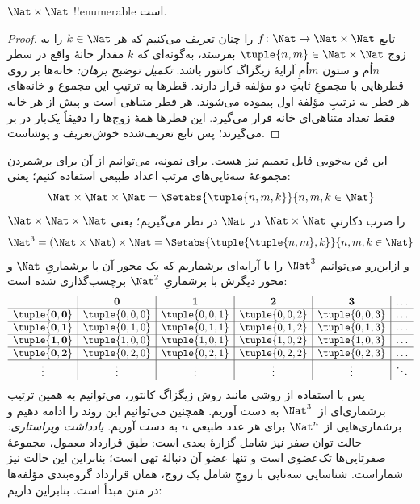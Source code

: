 \documentclass[../../../include/open-logic-section]{subfiles}
\begin{document}
\begin{prop}
$\Nat \times \Nat$ !!{enumerable} است.
\end{prop}

\begin{proof}
تابع $f \colon \Nat \to \Nat\times\Nat$ را چنان تعریف می‌کنیم که هر
$k \in \Nat$ را به زوج $\tuple{n,m} \in \Nat \times \Nat$ بفرستد،
به‌گونه‌ای که $k$
مقدار خانهٔ واقع در سطر $n$اُم و ستون $m$اُمِ آرایهٔ زیگزاگ کانتور باشد.
\emph{تکمیل توضیح برهان:} خانه‌ها بر روی قطرهایی با مجموعِ ثابتِ دو مؤلفه
قرار دارند. قطرها به ترتیبِ این مجموع و خانه‌های هر قطر به ترتیبِ مؤلفهٔ اول
پیموده می‌شوند. هر قطر متناهی است و پیش از هر خانه فقط تعداد متناهی‌ای خانه
قرار می‌گیرد. این قطرها همهٔ زوج‌ها را دقیقاً یک‌بار در بر می‌گیرند؛ پس تابع
تعریف‌شده خوش‌تعریف و پوشاست.
\end{proof}

\begin{explain}
این فن به‌خوبی قابل تعمیم نیز هست. برای نمونه، می‌توانیم از آن برای
برشمردن مجموعهٔ سه‌تایی‌های مرتب اعداد طبیعی استفاده کنیم؛ یعنی:
\[
\Nat \times \Nat \times \Nat = \Setabs{\tuple{n,m,k}}{n,m,k \in \Nat}
\]
$\Nat \times \Nat \times \Nat$ را ضرب دکارتیِ
$\Nat \times \Nat$ در $\Nat$ در نظر می‌گیریم؛ یعنی
\[
\Nat^3 = (\Nat \times \Nat) \times \Nat =
\Setabs{\tuple{\tuple{n,m},k}}{n, m, k
  \in \Nat }
\]
و ازاین‌رو می‌توانیم $\Nat^3$ را با آرایه‌ای برشماریم که یک محور آن
با برشماریِ $\Nat$ و محور دیگرش با برشماریِ $\Nat^2$ برچسب‌گذاری شده است:
\[
\begin{array}{ c | c | c | c | c | c}
& \mathbf 0 & \mathbf 1 & \mathbf 2 & \mathbf 3 & \dots \\
\hline
\mathbf{\tuple{0,0}} & \tuple{0,0,0} & \tuple{0,0,1} & \tuple{0,0,2} & \tuple{0,0,3} & \dots \\
\hline
\mathbf{\tuple{0,1}} & \tuple{0,1,0} & \tuple{0,1,1} & \tuple{0,1,2} & \tuple{0,1,3} & \dots \\
\hline
\mathbf{\tuple{1,0}} & \tuple{1,0,0} & \tuple{1,0,1} & \tuple{1,0,2} & \tuple{1,0,3} & \dots \\
\hline
\mathbf{\tuple{0,2}} & \tuple{0,2,0} & \tuple{0,2,1} & \tuple{0,2,2} & \tuple{0,2,3} & \dots\\
\hline
\vdots & \vdots & \vdots & \vdots & \vdots & \ddots \\
\end{array}
\]
پس با استفاده از روشی مانند روش زیگزاگ کانتور، می‌توانیم به همین ترتیب
برشماری‌ای از~$\Nat^3$ به دست آوریم. همچنین می‌توانیم این روند را ادامه
دهیم و برشماری‌هایی از $\Nat^n$ برای هر عدد طبیعی $n$ به دست آوریم.
\emph{یادداشت ویراستاری:} حالت توان صفر نیز شامل گزارهٔ بعدی است:
طبق قرارداد معمول، مجموعهٔ صفر‌تایی‌ها تک‌عضوی است و تنها عضو آن دنبالهٔ تهی
است؛ بنابراین این حالت نیز شماراست. شناسایی سه‌تایی با زوجِ شامل یک زوج،
همان قرارداد گروه‌بندی مؤلفه‌ها در متن مبدأ است.
بنابراین داریم:
\end{explain}
\end{document}
